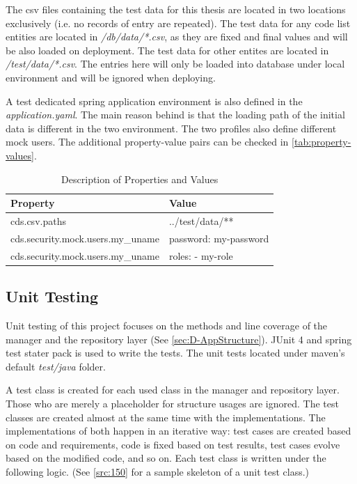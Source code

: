 The csv files containing the test data for this thesis are located in two locations exclusively (i.e. no records of entry are repeated). The test data for any code list entities are located in \textit{/db/data/*.csv}, as they are fixed and final values and will be also loaded on deployment. The test data for other entites are located in \textit{/test/data/*.csv}. The entries here will only be loaded into database under local environment and will be ignored when deploying.

A test dedicated spring application environment is also defined in the \textit{application.yaml}. The main reason behind is that the loading path of the initial data is different in the two environment. The two profiles also define different mock users.
The additional property-value pairs can be checked in \autoref{tab:property-values}.

\begin{table}[ht]
\centering
\begin{tabular}{|l|l|}
\hline
\textbf{Property} & \textbf{Value} \\
\hline
cds.csv.paths & ../test/data/** \\
cds.security.mock.users.my\_uname & password: my-password \\
cds.security.mock.users.my\_uname & roles: - my-role \\
\hline
\end{tabular}
\caption{Description of Properties and Values}
\label{tab:property-values}
\end{table}


\subsection{Unit Testing}
\label{subsec:test-unit}

Unit testing \cite{unit-test} of this project focuses on the methods and line coverage of the manager and the repository layer (See \autoref{sec:D-AppStructure}). JUnit 4 \cite{junit} and spring test \cite{spring-testing} stater pack is used to write the tests. The unit tests located under maven's default \textit{test/java} folder. 

A test class is created for each used class in the manager and repository layer. Those who are merely a placeholder for structure usages are ignored. The test classes are created almost at the same time with the implementations. The implementations of both happen in an iterative way: test cases are created based on code and requirements, code is fixed based on test results, test cases evolve based on the modified code, and so on. Each test class is written under the following logic. (See \autoref{src:150} for a sample skeleton of a unit test class.)


